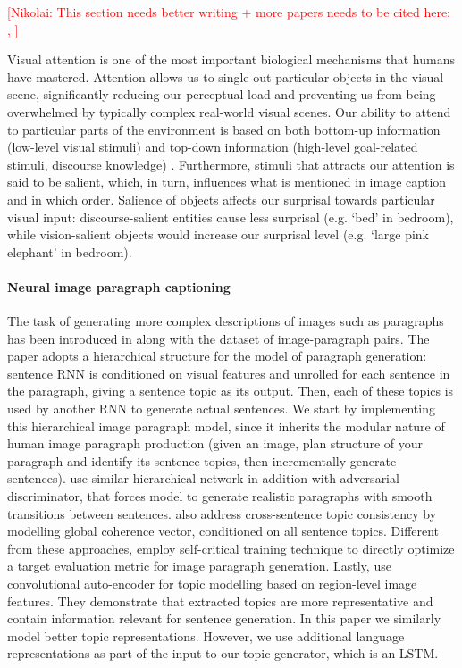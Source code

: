 \documentclass[11pt,a4paper]{article}
\newcommand{\kibitz}[2]{\ifnum\Comments=1\textcolor{#1}{#2}\fi}
\newcommand{\nikolai}[1]{\kibitz{red}      {[Nikolai: #1]}}
\begin{document}
\nikolai{This section needs better writing + more papers needs to be cited here: \cite{Ullman87}, \cite{Dobnik2016AMF}}

Visual attention is one of the most important biological mechanisms that humans have mastered.
Attention allows us to single out particular objects in the visual scene, significantly reducing our perceptual load \cite{Lavie04} and preventing us from being overwhelmed by typically complex real-world visual scenes.
Our ability to attend to particular parts of the environment is based on both bottom-up information (low-level visual stimuli) and top-down information (high-level goal-related stimuli, discourse knowledge) \cite{Zarcone2016}.
Furthermore, stimuli that attracts our attention is said to be salient, which, in turn, influences what is mentioned in image caption and in which order. Salience of objects affects our surprisal towards particular visual input: discourse-salient entities cause less surprisal (e.g. `bed' in bedroom), while vision-salient objects would increase our surprisal level (e.g. `large pink elephant' in bedroom).

\paragraph{Neural image paragraph captioning}
The task of generating more complex descriptions of images such as paragraphs has been introduced in  along with the dataset of image-paragraph pairs.
The paper adopts a hierarchical structure for the model of paragraph generation: sentence RNN is conditioned on visual features and unrolled for each sentence in the paragraph, giving a sentence topic as its output.
Then, each of these topics is used by another RNN to generate actual sentences.
We start by implementing this hierarchical image paragraph model, since it inherits the modular nature of human image paragraph production (given an image, plan structure of your paragraph and identify its sentence topics, then incrementally generate sentences).
 use similar hierarchical network in addition with adversarial discriminator, that forces model to generate realistic paragraphs with smooth transitions between sentences.
 also address cross-sentence topic consistency by modelling global coherence vector, conditioned on all sentence topics.
Different from these approaches,  employ self-critical training technique \cite{selfcritical2016} to directly optimize a target evaluation metric for image paragraph generation.
Lastly,  use convolutional auto-encoder for topic modelling based on region-level image features. They demonstrate that extracted topics are more representative and contain information relevant for sentence generation.
In this paper we similarly model better topic representations. However, we use additional language representations as part of the input to our topic generator, which is an LSTM.
\end{document}
